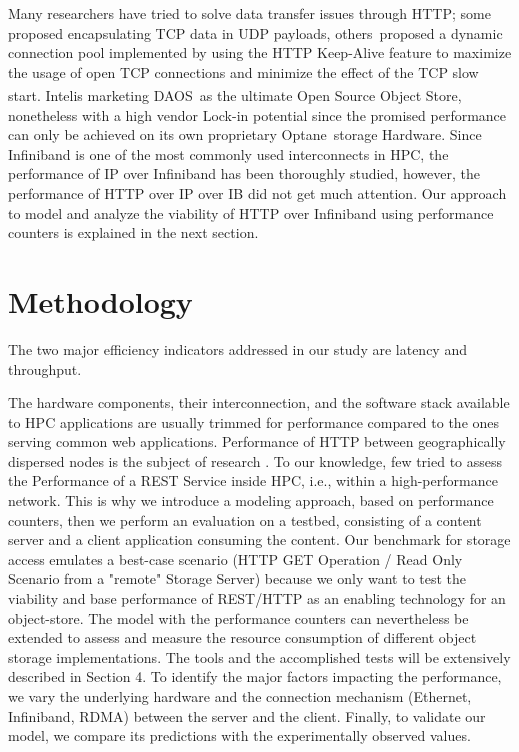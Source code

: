\documentclass[runningheads]{llncs}
\begin{document}
Many researchers have tried to solve data transfer issues through HTTP; some\,\cite{forest} proposed encapsulating TCP data in UDP payloads, others\,\cite {Devresse} proposed a dynamic connection pool implemented by using the HTTP Keep-Alive feature to maximize the usage of open TCP connections and minimize the effect of the TCP slow start. Intel\textsuperscript \textregistered  is marketing DAOS\,\cite{DAOS} as the ultimate Open Source Object Store, nonetheless with a high vendor Lock-in potential since the promised performance can only be achieved on its own proprietary Optane\,\cite{Optane} storage Hardware.
Since Infiniband \cite{Infiniband} is one of the most commonly used interconnects in HPC, the performance of IP over Infiniband \cite{bortolotti2011comparison,grant2010study} has been thoroughly studied, however, the performance of HTTP over IP over IB did not get much attention. Our approach to model and analyze the viability of HTTP over Infiniband using performance counters is explained in the next section.



\section {Methodology} \label{sec:methodology}
The two major efficiency indicators addressed in our study are latency and throughput.

The hardware components, their interconnection, and the software stack available to HPC applications are usually trimmed for performance compared to the ones serving common web applications. Performance of HTTP between geographically dispersed nodes is the subject of research \cite{tcpperfprediction}. To our knowledge, few tried to assess the Performance of a REST Service inside HPC, i.e., within a high-performance network. This is why we introduce a modeling approach, based on performance counters, then we perform an evaluation on a testbed, consisting of a content server and a client application consuming the content. Our benchmark for storage access emulates a best-case scenario (HTTP GET Operation / Read Only Scenario from a "remote" Storage Server) because we only want to test the viability and base performance of REST/HTTP as an enabling technology for an object-store. The model with the performance counters can nevertheless be extended to assess and measure the resource consumption of different object storage implementations. The tools and the accomplished tests will be extensively described in Section 4. To identify the major factors impacting the performance, we vary the underlying hardware and the connection mechanism (Ethernet, Infiniband, RDMA) between the server and the client. Finally, to validate our model, we compare its predictions with the experimentally observed values.
\end{document}
